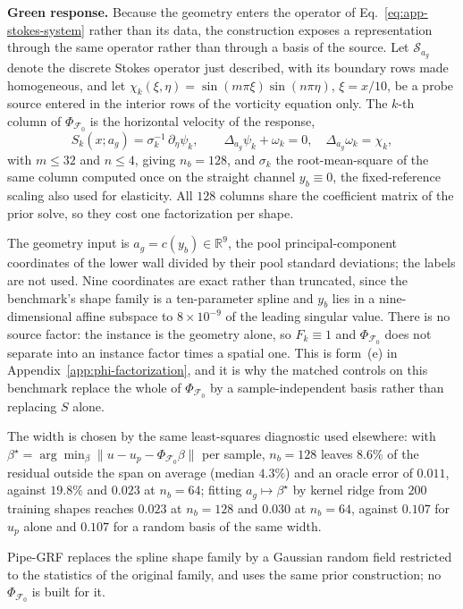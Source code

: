\documentclass{article}
\begin{document}
\textbf{Green response.}
Because the geometry enters the operator of Eq.~\ref{eq:app-stokes-system} rather than its
data, the construction exposes a representation through the same operator rather than
through a basis of the source. Let $\mathcal{S}_{a_g}$ denote the discrete Stokes operator
just described, with its boundary rows made homogeneous, and let
$\chi_k(\xi,\eta)=\sin(m\pi\xi)\sin(n\pi\eta)$, $\xi=x/10$, be a probe source entered in the
interior rows of the vorticity equation only. The $k$-th column of
$\Phi_{\mathcal F_0}$ is the horizontal velocity of the response,
\begin{equation}
S_k(x;a_g)
=
\sigma_k^{-1}\,\partial_\eta\psi_k,
\qquad
\Delta_{a_g}\psi_k+\omega_k=0,
\quad
\Delta_{a_g}\omega_k=\chi_k,
\label{eq:app-stokes-green}
\end{equation}
with $m\le32$ and $n\le4$, giving $n_b=128$, and $\sigma_k$ the root-mean-square of the
same column computed once on the straight channel $y_b\equiv0$, the fixed-reference scaling
also used for elasticity. All $128$ columns share the coefficient matrix of the prior solve,
so they cost one factorization per shape.

The geometry input is $a_g=c(y_b)\in\mathbb{R}^{9}$, the pool principal-component
coordinates of the lower wall divided by their pool standard deviations; the labels are not
used. Nine coordinates are exact rather than truncated, since the benchmark's shape family
is a ten-parameter spline and $y_b$ lies in a nine-dimensional affine subspace to $8\times
10^{-9}$ of the leading singular value. There is no source factor: the instance is the
geometry alone, so $F_k\equiv1$ and $\Phi_{\mathcal F_0}$ does not separate into an instance
factor times a spatial one. This is form~(e) in Appendix~\ref{app:phi-factorization}, and it
is why the matched controls on this benchmark replace the whole of $\Phi_{\mathcal F_0}$ by
a sample-independent basis rather than replacing $S$ alone.

The width is chosen by the same least-squares diagnostic used elsewhere: with
$\beta^\star=\arg\min_\beta\|u-u_p-\Phi_{\mathcal F_0}\beta\|$ per sample, $n_b=128$ leaves
$8.6\%$ of the residual outside the span on average (median $4.3\%$) and an oracle error of
$0.011$, against $19.8\%$ and $0.023$ at $n_b=64$; fitting $a_g\mapsto\beta^\star$ by kernel
ridge from $200$ training shapes reaches $0.023$ at $n_b=128$ and $0.030$ at $n_b=64$,
against $0.107$ for $u_p$ alone and $0.107$ for a random basis of the same width.

Pipe-GRF replaces the spline shape family by a Gaussian random field restricted to the
statistics of the original family, and uses the same prior construction; no
$\Phi_{\mathcal F_0}$ is built for it.
\end{document}
